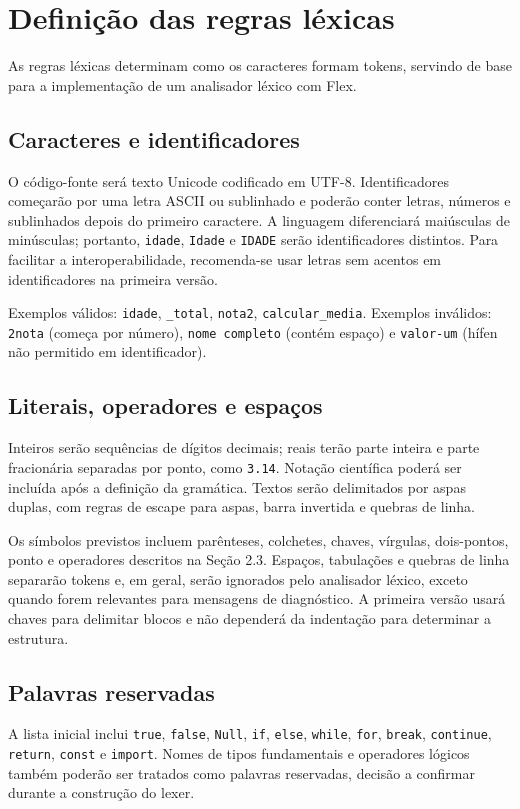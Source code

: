 \documentclass[12pt,a4paper]{article}
\begin{document}
\section{Definição das regras léxicas}
As regras léxicas determinam como os caracteres formam tokens, servindo de base para a implementação de um analisador léxico com Flex.

\subsection{Caracteres e identificadores}
O código-fonte será texto Unicode codificado em UTF-8. Identificadores começarão por uma letra ASCII ou sublinhado e poderão conter letras, números e sublinhados depois do primeiro caractere. A linguagem diferenciará maiúsculas de minúsculas; portanto, \texttt{idade}, \texttt{Idade} e \texttt{IDADE} serão identificadores distintos. Para facilitar a interoperabilidade, recomenda-se usar letras sem acentos em identificadores na primeira versão.

Exemplos válidos: \texttt{idade}, \texttt{\_total}, \texttt{nota2}, \texttt{calcular\_media}. Exemplos inválidos: \texttt{2nota} (começa por número), \texttt{nome completo} (contém espaço) e \texttt{valor-um} (hífen não permitido em identificador).

\subsection{Literais, operadores e espaços}
Inteiros serão sequências de dígitos decimais; reais terão parte inteira e parte fracionária separadas por ponto, como \texttt{3.14}. Notação científica poderá ser incluída após a definição da gramática. Textos serão delimitados por aspas duplas, com regras de escape para aspas, barra invertida e quebras de linha.

Os símbolos previstos incluem parênteses, colchetes, chaves, vírgulas, dois-pontos, ponto e operadores descritos na Seção 2.3. Espaços, tabulações e quebras de linha separarão tokens e, em geral, serão ignorados pelo analisador léxico, exceto quando forem relevantes para mensagens de diagnóstico. A primeira versão usará chaves para delimitar blocos e não dependerá da indentação para determinar a estrutura.

\subsection{Palavras reservadas}
A lista inicial inclui \texttt{true}, \texttt{false}, \texttt{Null}, \texttt{if}, \texttt{else}, \texttt{while}, \texttt{for}, \texttt{break}, \texttt{continue}, \texttt{return}, \texttt{const} e \texttt{import}. Nomes de tipos fundamentais e operadores lógicos também poderão ser tratados como palavras reservadas, decisão a confirmar durante a construção do lexer.
\end{document}
